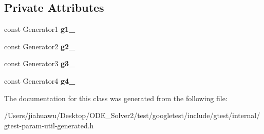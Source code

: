 \subsection*{Private Attributes}
\begin{DoxyCompactItemize}
\item 
\mbox{\label{classtesting_1_1internal_1_1_cartesian_product_holder4_a97b0b3e9d00032e74d2268ea3522b91e}} 
const Generator1 {\bfseries g1\+\_\+}
\item 
\mbox{\label{classtesting_1_1internal_1_1_cartesian_product_holder4_a9ffdd249b134b5e02bda2b0da5e58079}} 
const Generator2 {\bfseries g2\+\_\+}
\item 
\mbox{\label{classtesting_1_1internal_1_1_cartesian_product_holder4_aeb61459965ce3c332f810b71dbd63f51}} 
const Generator3 {\bfseries g3\+\_\+}
\item 
\mbox{\label{classtesting_1_1internal_1_1_cartesian_product_holder4_af2f02bd4d973ffad64c4fb198882b9ef}} 
const Generator4 {\bfseries g4\+\_\+}
\end{DoxyCompactItemize}


The documentation for this class was generated from the following file\+:\begin{DoxyCompactItemize}
\item 
/\+Users/jiahuawu/\+Desktop/\+O\+D\+E\+\_\+\+Solver2/test/googletest/include/gtest/internal/gtest-\/param-\/util-\/generated.\+h\end{DoxyCompactItemize}
